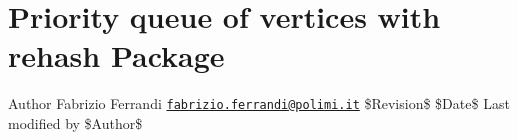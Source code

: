 \hypertarget{group__Rehashed__heap}{}\section{Priority queue of vertices with rehash Package}
\label{group__Rehashed__heap}
\begin{DoxyAuthor}{Author}
Fabrizio Ferrandi \href{mailto:fabrizio.ferrandi@polimi.it}{\tt fabrizio.\+ferrandi@polimi.\+it} \$\+Revision\$ \$\+Date\$ Last modified by \$\+Author\$ 
\end{DoxyAuthor}
